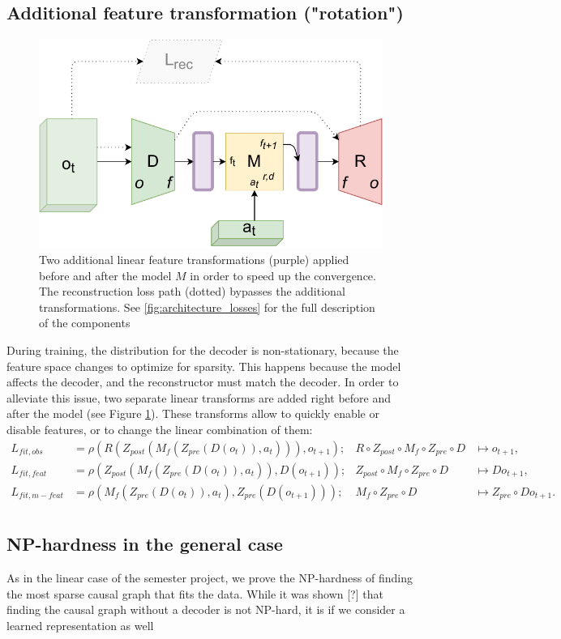 \documentclass[a4paper,11pt,oneside]{report}
\begin{document}
\subsection{Additional feature transformation ("rotation")}
\begin{figure}[h]
    \centering
    \includegraphics[width=0.7\linewidth]{diagrams/architecture_rotation}
    \caption{Two additional linear feature transformations (purple) applied before and after the model $M$ in order to speed up the convergence. The reconstruction loss path (dotted) bypasses the additional transformations. See \autoref{fig:architecture_losses} for the full description of the components}
    \label{fig:architecture_rotation}
\end{figure}


During training, the distribution for the decoder is non-stationary, because the feature space changes to optimize for sparsity. This happens because the model affects the decoder, and the reconstructor must match the decoder. In order to alleviate this issue, two separate linear transforms are added right before and after the model (see Figure \ref{fig:architecture_rotation}). These transforms allow to quickly enable or disable features, or to change the linear combination of them:
$$
\begin{array}{clll}
L_{fit, obs}&=\rho(R(Z_{post}(M_f(Z_{pre}(D(o_t)),a_t))), o_{t+1});& R\circ Z_{post}\circ M_f \circ Z_{pre}\circ D&\mapsto o_{t+1},\\
L_{fit, feat}&=\rho(Z_{post}(M_f(Z_{pre}(D(o_t)),a_t)), D(o_{t+1}));&Z_{post}\circ M_f\circ Z_{pre}\circ D&\mapsto Do_{t+1},\\
L_{fit, m-feat}&=\rho(M_f(Z_{pre}(D(o_t)),a_t), Z_{pre}(D(o_{t+1})));&M_f\circ Z_{pre}\circ D&\mapsto Z_{pre}\circ Do_{t+1}.\\
\end{array}
$$

\subsection{NP-hardness in the general case}
As in the linear case of the semester project, we prove the NP-hardness of finding the most sparse causal graph that fits the data. While it was shown [?] that finding the causal graph without a decoder is not NP-hard, it is if we consider a learned representation as well
\end{document}
